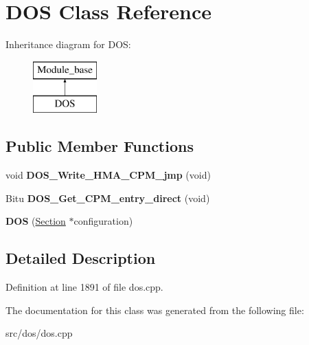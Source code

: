\hypertarget{classDOS}{\section{D\-O\-S Class Reference}
\label{classDOS}
}
Inheritance diagram for D\-O\-S\-:\begin{figure}[H]
\begin{center}
\leavevmode
\includegraphics[height=2.000000cm]{classDOS}
\end{center}
\end{figure}
\subsection*{Public Member Functions}
\begin{DoxyCompactItemize}
\item 
\hypertarget{classDOS_a298dcab5e49ceecb15a2c1d9c4871866}{void {\bfseries D\-O\-S\-\_\-\-Write\-\_\-\-H\-M\-A\-\_\-\-C\-P\-M\-\_\-jmp} (void)}\label{classDOS_a298dcab5e49ceecb15a2c1d9c4871866}

\item 
\hypertarget{classDOS_a1fd7a02e49365782f597f1e4e0d67779}{Bitu {\bfseries D\-O\-S\-\_\-\-Get\-\_\-\-C\-P\-M\-\_\-entry\-\_\-direct} (void)}\label{classDOS_a1fd7a02e49365782f597f1e4e0d67779}

\item 
\hypertarget{classDOS_ad9dde79e7c7a3940e8aec707edc6e4ac}{{\bfseries D\-O\-S} (\hyperlink{classSection}{Section} $\ast$configuration)}\label{classDOS_ad9dde79e7c7a3940e8aec707edc6e4ac}

\end{DoxyCompactItemize}


\subsection{Detailed Description}


Definition at line 1891 of file dos.\-cpp.



The documentation for this class was generated from the following file\-:\begin{DoxyCompactItemize}
\item 
src/dos/dos.\-cpp\end{DoxyCompactItemize}
